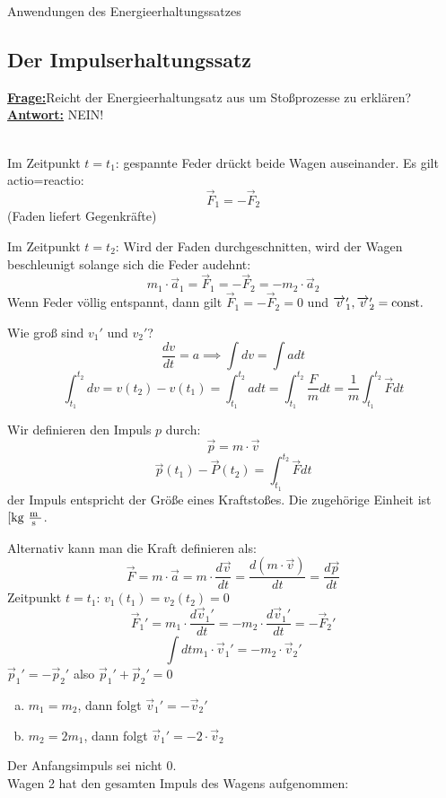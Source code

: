 \documentclass[a4paper,10pt]{scrartcl}
\begin{document}
\begin{seg}{Anwendungen des Energieerhaltungssatzes}
 \end{seg}
    
\subsection{Der Impulserhaltungssatz}
\underline{\textbf{Frage:}}Reicht der Energieerhaltungsatz aus um Stoßprozesse zu erklären?\\
\underline{\textbf{Antwort:}} NEIN!\\

\\
\begin{seg}{Im Zeitpunkt $\boxed{t=t_1}$:}
  gespannte Feder drückt beide Wagen auseinander. Es gilt actio=reactio:
\[
 \vec F_1=-\vec F_2
\]
(Faden liefert Gegenkräfte)
\end{seg}
\begin{seg}{Im Zeitpunkt $\boxed{t=t_2}$:}
 Wird der Faden durchgeschnitten, wird der Wagen beschleunigt solange sich die Feder audehnt:
\[
 m_1\cdot \vec a_1=\vec F_1=-\vec F_2=-m_2\cdot \vec a_2
\]
Wenn Feder völlig entspannt, dann gilt $\vec F_1=-\vec F_2=0$ und $\overrightarrow{v}_1', \overrightarrow{v}_2'=\text{const}.$
\end{seg}
\begin{seg}{Wie groß sind $v_1'$ und $v_2'$?}
\[
 \frac{dv}{dt}=a \implies \int dv=\int a dt
\]
\[
 \int_{t_1}^{t_2}dv=v(t_2)-v(t_1)=\int_{t_1}^{t_2} a dt =\int_{t_1}^{t_2} \frac{F}{m} dt=\frac{1}{m} \int_{t_1}^{t_2} \vec F dt
\]
\begin{df}[Impuls]
 Wir definieren den Impuls $p$ durch:
\[
 \vec p =m\cdot \vec v 
\]
\[
 \vec p(t_1)-\vec P(t_2)=\int_{t_1}^{t_2} \vec F dt
\]
der Impuls entspricht der Größe eines Kraftstoßes.  Die zugehörige Einheit ist $[\text{kg } \frac{\text{m }}{\text{s }}$.
\end{df} 
Alternativ kann man die Kraft definieren als:
\[
 \vec F=m\cdot \vec a=m\cdot \frac{d\vec v}{dt}=\frac{d(m\cdot \vec v)}{dt}=\frac{d\vec p}{dt}
\]
Zeitpunkt $t=t_1$: $v_1(t_1)=v_2(t_2)=0$\\
\[
 \vec F_1'=m_1\cdot \frac{d\vec v_1'}{dt}=-m_2\cdot \frac{d\vec v_1'}{dt}=-\vec F_2'
\]
\[
 \int dt m_1\cdot \vec v_1'=-m_2\cdot \vec v_2'
\]
$\vec p_1'=-\vec p_2'$ also $\boxed{\vec p_1'+\vec p_2'=0}$
\begin{enumerate}[a)]
 \item $m_1=m_2$, dann folgt $\vec v_1'=-\vec v_2'$
 \item $m_2=2m_1$, dann folgt $\vec v_1'=-2\cdot \vec v_2$
\end{enumerate}
Der Anfangsimpuls sei nicht $0$. \\
Wagen 2 hat den gesamten Impuls des Wagens aufgenommen:
\end{seg}
\end{document}

